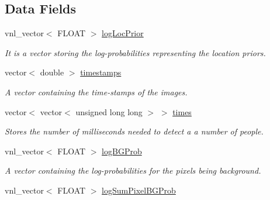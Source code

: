 \subsection*{Data Fields}
\begin{DoxyCompactItemize}
\item 
\hypertarget{classfindPersonImage_a337c4cd7f149bc0c775c244d75ed9293}{
vnl\_\-vector$<$ FLOAT $>$ \hyperlink{classfindPersonImage_a337c4cd7f149bc0c775c244d75ed9293}{logLocPrior}}
\label{classfindPersonImage_a337c4cd7f149bc0c775c244d75ed9293}

\begin{DoxyCompactList}\small\item\em It is a vector storing the log-\/probabilities representing the location priors. \item\end{DoxyCompactList}\item 
\hypertarget{classfindPersonImage_ada03328a9187736162c7277d89ef159e}{
vector$<$ double $>$ \hyperlink{classfindPersonImage_ada03328a9187736162c7277d89ef159e}{timestamps}}
\label{classfindPersonImage_ada03328a9187736162c7277d89ef159e}

\begin{DoxyCompactList}\small\item\em A vector containing the time-\/stamps of the images. \item\end{DoxyCompactList}\item 
\hypertarget{classfindPersonImage_ac150111bafc331bafb353619452c5c5c}{
vector$<$ vector$<$ unsigned long long $>$ $>$ \hyperlink{classfindPersonImage_ac150111bafc331bafb353619452c5c5c}{times}}
\label{classfindPersonImage_ac150111bafc331bafb353619452c5c5c}

\begin{DoxyCompactList}\small\item\em Stores the number of milliseconds needed to detect a a number of people. \item\end{DoxyCompactList}\item 
\hypertarget{classfindPersonImage_adf313582371b7197c79848aa871c700b}{
vnl\_\-vector$<$ FLOAT $>$ \hyperlink{classfindPersonImage_adf313582371b7197c79848aa871c700b}{logBGProb}}
\label{classfindPersonImage_adf313582371b7197c79848aa871c700b}

\begin{DoxyCompactList}\small\item\em A vector containing the log-\/probabilities for the pixels being background. \item\end{DoxyCompactList}\item 
\hypertarget{classfindPersonImage_a7d55fe31445fcd7529814d4e5e1ec3ff}{
vnl\_\-vector$<$ FLOAT $>$ \hyperlink{classfindPersonImage_a7d55fe31445fcd7529814d4e5e1ec3ff}{logSumPixelBGProb}}
\label{classfindPersonImage_a7d55fe31445fcd7529814d4e5e1ec3ff}


\end{DoxyCompactItemize}
